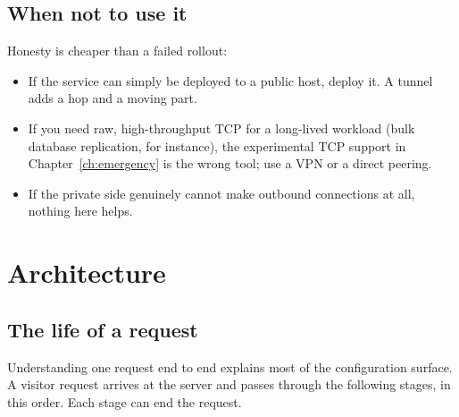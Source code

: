 \documentclass[11pt,a4paper,oneside]{book}
\begin{document}
\section{When not to use it}

Honesty is cheaper than a failed rollout:

\begin{itemize}[leftmargin=1.3em]
  \item If the service can simply be deployed to a public host, deploy it.
        A tunnel adds a hop and a moving part.
  \item If you need raw, high-throughput TCP for a long-lived workload
        (bulk database replication, for instance), the experimental TCP
        support in Chapter~\ref{ch:emergency} is the wrong tool; use a
        VPN or a direct peering.
  \item If the private side genuinely cannot make outbound connections at
        all, nothing here helps.
\end{itemize}

\chapter{Architecture}
\label{ch:architecture}

\section{The life of a request}

Understanding one request end to end explains most of the configuration
surface. A visitor request arrives at the server and passes through the
following stages, in this order. Each stage can end the request.
\end{document}
